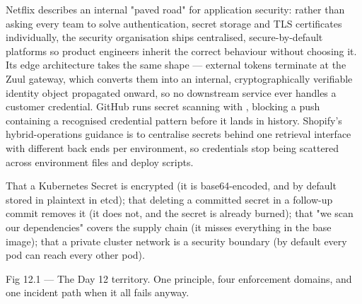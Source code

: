  Netflix describes an internal "paved road" for application security: rather than asking every team to solve authentication, secret storage and TLS certificates individually, the security organisation ships centralised, secure-by-default platforms so product engineers inherit the correct behaviour without choosing it. Its edge architecture takes the same shape --- external tokens terminate at the Zuul gateway, which converts them into an internal, cryptographically verifiable identity object propagated onward, so no downstream service ever handles a customer credential. GitHub runs secret scanning with , blocking a push containing a recognised credential pattern before it lands in history. Shopify's hybrid-operations guidance is to centralise secrets behind one retrieval interface with different back ends per environment, so credentials stop being scattered across environment files and deploy scripts.

 That a Kubernetes Secret is encrypted (it is base64-encoded, and by default stored in plaintext in etcd); that deleting a committed secret in a follow-up commit removes it (it does not, and the secret is already burned); that "we scan our dependencies" covers the supply chain (it misses everything in the base image); that a private cluster network is a security boundary (by default every pod can reach every other pod).


\begin{wbfigure}{Fig 12.1 — The Day 12 territory. One principle, four enforcement domains, and one incident path when it all fails anyway.}
\end{wbfigure}

